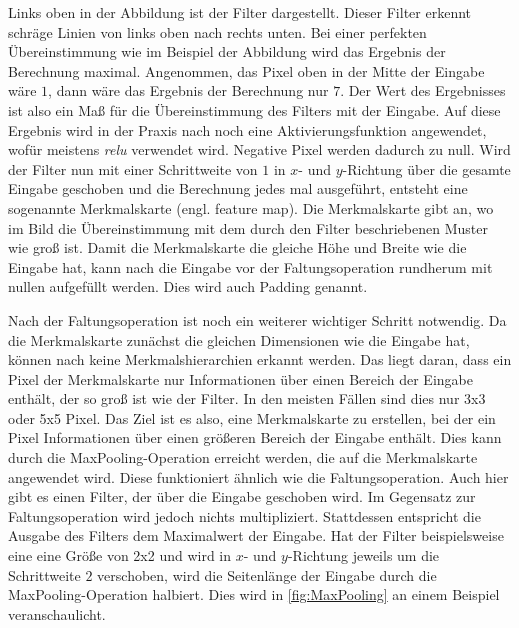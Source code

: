 Links oben in der Abbildung ist der Filter dargestellt.
Dieser Filter erkennt schräge Linien von links oben nach rechts unten.
Bei einer perfekten Übereinstimmung wie im Beispiel der Abbildung wird das Ergebnis der Berechnung maximal.
Angenommen, das Pixel oben in der Mitte der Eingabe wäre $1$, dann wäre das Ergebnis der Berechnung nur $7$.
Der Wert des Ergebnisses ist also ein Maß für die Übereinstimmung des Filters mit der Eingabe.
Auf diese Ergebnis wird in der Praxis nach \cite{6S191CNN} noch eine Aktivierungsfunktion angewendet, wofür meistens \emph{\acrshort{relu}} verwendet wird.
Negative Pixel werden dadurch zu null.
Wird der Filter nun mit einer Schrittweite von $1$ in $x$- und $y$-Richtung über die gesamte Eingabe geschoben und die Berechnung jedes mal ausgeführt, entsteht eine sogenannte Merkmalskarte (engl. feature map).
Die Merkmalskarte gibt an, wo im Bild die Übereinstimmung mit dem durch den Filter beschriebenen Muster wie groß ist.
Damit die Merkmalskarte die gleiche Höhe und Breite wie die Eingabe hat, kann nach \cite[S. 168 f.]{DeepLearningPythonKeras} die Eingabe vor der Faltungsoperation rundherum mit nullen aufgefüllt werden.
Dies wird auch Padding genannt.

Nach der Faltungsoperation ist noch ein weiterer wichtiger Schritt notwendig.
Da die Merkmalskarte zunächst die gleichen Dimensionen wie die Eingabe hat, können nach \cite[S. 171]{DeepLearningPythonKeras} keine Merkmalshierarchien erkannt werden.
Das liegt daran, dass ein Pixel der Merkmalskarte nur Informationen über einen Bereich der Eingabe enthält, der so groß ist wie der Filter.
In den meisten Fällen sind dies nur 3x3 oder 5x5 Pixel.
Das Ziel ist es also, eine Merkmalskarte zu erstellen, bei der ein Pixel Informationen über einen größeren Bereich der Eingabe enthält.
Dies kann durch die MaxPooling-Operation erreicht werden, die auf die Merkmalskarte angewendet wird.
Diese funktioniert ähnlich wie die Faltungsoperation.
Auch hier gibt es einen Filter, der über die Eingabe geschoben wird.
Im Gegensatz zur Faltungsoperation wird jedoch nichts multipliziert.
Stattdessen entspricht die Ausgabe des Filters dem Maximalwert der Eingabe.
Hat der Filter beispielsweise eine eine Größe von 2x2 und wird in $x$- und $y$-Richtung jeweils um die Schrittweite $2$ verschoben, wird die Seitenlänge der Eingabe durch die MaxPooling-Operation halbiert.
Dies wird in \autoref{fig:MaxPooling} an einem Beispiel veranschaulicht.

